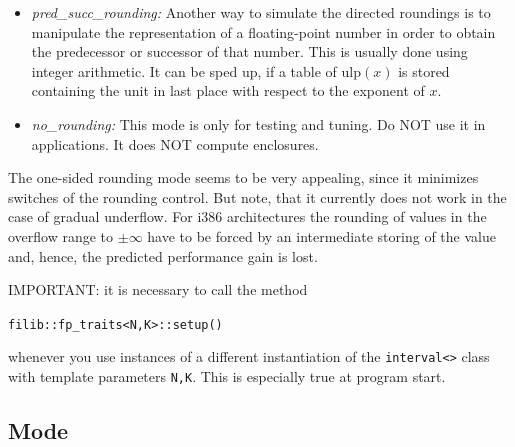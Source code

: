 \documentclass{report}
\newcommand{\R}{\mathbb{R}}
\newtheorem{theorem}{Theorem}
\begin{document}
\begin{itemize}
Note that, because $\mathrm{high}(a) = -\mathrm{low}(-a)$, one function
suffices. 

For a binary floating-point system $R=R(2,n,emin,emax)$ we have 
\[\mathrm{pred}(1) = 1 -2^{-n} = 1 - \frac{1}{2}\varepsilon ^*\]
\[\mathrm{succ}(1) = 1 +2^{1-n} = 1 + \varepsilon ^*\]
where $\varepsilon ^* = 2^{1-n}$ denotes the bound for the relative rounding
error 
($|\varepsilon| \le \varepsilon^*$).

\begin{theorem}:\\
Let  $R=R(2,n,emin,emax)$ be  a binary floating-point system and $\bigcirc :
\R \rightarrow R$ the rounding to the nearest. Then for all $x \in \R$ not
in the over- or underflow range, i.e. $\verb?M? \ge |x| \ge 2^{emin-1}$ or $x = 0$, we have 
\[  \mathrm{low}(\bigcirc x) \le x \]
\[  \mathrm{high}(\bigcirc x) \ge x \]
\end{theorem}

For the proof, see \cite{multi}.
\item \textit{pred\_succ\_rounding:}
Another way to simulate the directed roundings is to manipulate the
representation of a floating-point number in order to obtain the predecessor or
successor of that number. This is usually done using integer arithmetic. It can
be sped up, if a table of $\textrm{ulp}(x)$ is stored containing the unit in last
place with respect to the exponent of $x$.

		\item \textit{no\_rounding:} 
This mode is only for testing and tuning. Do NOT use it in
applications. It does NOT compute enclosures.
\end{itemize}

The one-sided rounding mode seems to be very appealing, since it minimizes
switches of the rounding control. But note, that it currently does not work in
the case 
of gradual underflow. For i386 architectures the rounding of values in the
overflow range to $\pm \infty$ have to be forced by an intermediate storing of
the value and, hence, the predicted performance gain is lost.

IMPORTANT: it is necessary to call the method 
\begin{center}
	\texttt{filib::fp\_traits<N,K>::setup()}
\end{center}
whenever you use instances of a different instantiation of the \texttt{interval<>}
class with template parameters \texttt{N,K}. This is especially true
at program start. 
		\subsection{Mode}
		\label{Modus}
\end{document}
